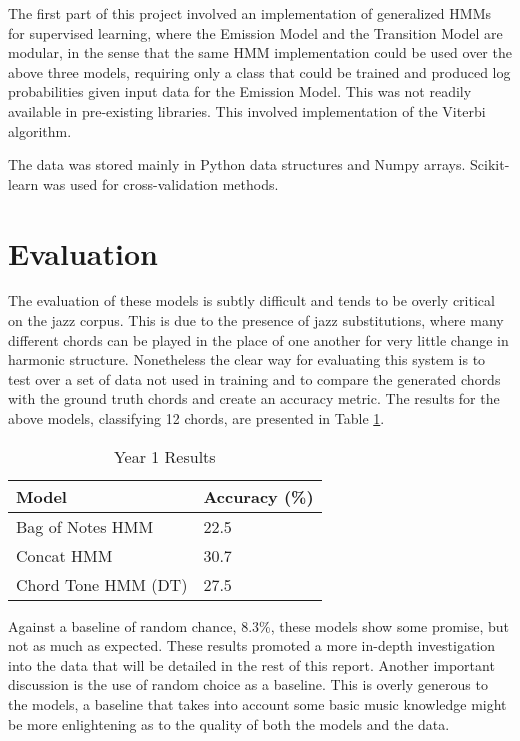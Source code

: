 \documentclass[bsc,singlespacing,logo, parskip, deptreport]{infthesis}
\begin{document}
The first part of this project involved an implementation of generalized HMMs for supervised learning, where the Emission Model and the Transition Model are modular, in the sense that the same HMM implementation could be used over the above three models, requiring only a class that could be trained and produced log probabilities given input data for the Emission Model. This was not readily available in pre-existing libraries. This involved implementation of the Viterbi algorithm.

The data was stored mainly in Python data structures and Numpy arrays. Scikit-learn was used for cross-validation methods.

\section{Evaluation}

The evaluation of these models is subtly difficult and tends to be overly critical on the jazz corpus. This is due to the presence of jazz substitutions, where many different chords can be played in the place of one another for very little change in harmonic structure. Nonetheless the clear way for evaluating this system is to test over a set of data not used in training and to compare the generated chords with the ground truth chords and create an accuracy metric. The results for the above models, classifying 12 chords, are presented in Table \ref{12}.

\begin{table}
\centering
\caption{Year 1 Results}
\label{12}
\begin{tabular}{l|l}
Model               & Accuracy (\%) \\ \hline
Bag of Notes HMM    & 22.5           \\
Concat HMM          & 30.7          \\
Chord Tone HMM (DT) & 27.5          \\
\end{tabular}
\end{table}

Against a baseline of random chance, 8.3\%, these models show some promise, but not as much as expected. These results promoted a more in-depth investigation into the data that will be detailed in the rest of this report. Another important discussion is the use of random choice as a baseline. This is overly generous to the models, a baseline that takes into account some basic music knowledge might be more enlightening as to the quality of both the models and the data.
\end{document}
